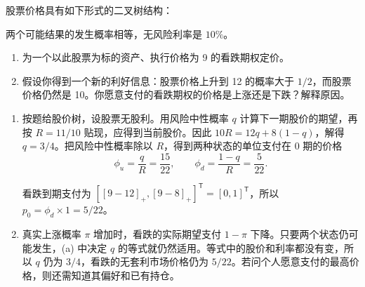 \begin{problem}
\WJFiveProblem{} 股票价格具有如下形式的二叉树结构：
\begin{center}
\end{center}
两个可能结果的发生概率相等，无风险利率是 $10\%$。
\begin{enumerate}[label=(\alph*)]
    \item 为一个以此股票为标的资产、执行价格为 9 的看跌期权定价。
    \item 假设你得到一个新的利好信息：股票价格上升到 12 的概率大于 $1/2$，而股票价格仍然是 10。你愿意支付的看跌期权的价格是上涨还是下跌？解释原因。
\end{enumerate}
\end{problem}
\begin{solution}[blank-type=manual,blank-vsep=9\baselineskip]

\begin{enumerate}[label=(\alph*)]
 \item 按题给股价树，设股票无股利。用风险中性概率 $q$ 计算下一期股价的期望，再按 $R=11/10$ 贴现，应得到当前股价。因此 $10R=12q+8(1-q)$，解得 $q=3/4$。把风险中性概率除以 $R$，得到两种状态的单位支付在 0 期的价格
 \[
 \phi_u=\frac qR=\frac{15}{22},\qquad
 \phi_d=\frac{1-q}R=\frac5{22}.
 \]

 看跌到期支付为 $[[9-12]_+,[9-8]_+]^{\mathsf T}=[0,1]^{\mathsf T}$，所以 $p_0=\phi_d\times1=5/22$。
 \item 真实上涨概率 $\pi$ 增加时，看跌的实际期望支付 $1-\pi$ 下降。只要两个状态仍可能发生，(a) 中决定 $q$ 的等式就仍然适用。等式中的股价和利率都没有变，所以 $q$ 仍为 $3/4$，看跌的无套利市场价格仍为 $5/22$。若问个人愿意支付的最高价格，则还需知道其偏好和已有持仓。
\end{enumerate}
\end{solution}


